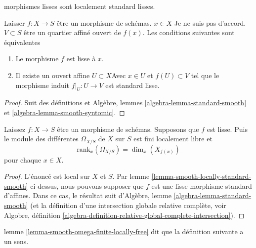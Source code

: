 \begin{lemma}

\label{lemma-smooth-locally-standard-smooth}

\begin{slogan}

morphismes lisses sont localement standard lisses.

\end{slogan}

Laisser $f : X  \to S$ être un morphisme de schémas. $x \in X$ Je ne suis pas d'accord. $V \subset S$ être un quartier affiné ouvert de $f(x)$. Les conditions suivantes sont équivalentes

\begin{enumerate}

\item Le morphisme $f$ est lisse à $x$.
\item Il existe un ouvert affine $U \subset X$Avec $x \in U$ et $f(U) \subset V$ tel que le morphisme induit $f|_U : U \to V$ est standard lisse.

\end{enumerate}

\end{lemma}

\begin{proof}
Suit des définitions et Algèbre, lemmes \ref{algebra-lemma-standard-smooth} et \ref{algebra-lemma-smooth-syntomic}.
\end{proof}

\begin{lemma}

\label{lemma-smooth-omega-finite-locally-free}
Laissez $f : X \to S$ être un morphisme de schémas. Supposons que $f$ est lisse. Puis le module des différentes $\Omega_{X/S}$ de $X$ sur $S$ est fini localement libre et $$
\text{rank}_x(\Omega_{X/S}) = \dim_x(X_{f(x)})
$$ pour chaque $x \in X$.
\end{lemma}

\begin{proof}
L'énoncé est local sur $X$ et $S$. Par lemme \ref{lemma-smooth-locally-standard-smooth} ci-dessus, nous pouvons supposer que $f$ est une lisse morphisme standard d'affines. Dans ce cas, le résultat suit d'Algèbre, lemme \ref{algebra-lemma-standard-smooth} (et la définition d'une intersection globale relative complète, voir Algobre, définition \ref{algebra-definition-relative-global-complete-intersection}).
\end{proof}

\noindent
lemme \ref{lemma-smooth-omega-finite-locally-free} dit que la définition suivante a un sens.

